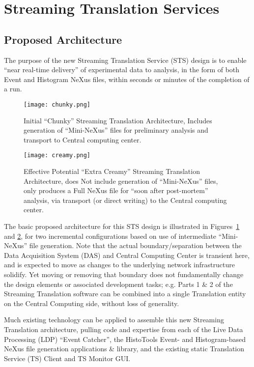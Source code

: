 \section{Streaming Translation Services}


\subsection{Proposed Architecture}

The purpose of the new Streaming Translation Service (STS) design is to enable
``near real-time delivery'' of experimental data to analysis, in the form of
both Event and Histogram NeXus files, within seconds or minutes of the
completion of a run.

\begin{figure}[htb]
\centering
\texttt{[image: chunky.png]}
\caption{Initial ``Chunky'' Streaming Translation Architecture, Includes
generation of ``Mini-NeXus'' files for preliminary analysis and transport to
Central computing center.}
\label{fig:chunky_sts}
\end{figure}


\begin{figure}[htb]
\centering
\texttt{[image: creamy.png]}
\caption{Effective Potential ``Extra Creamy'' Streaming Translation
Architecture, does Not include generation of ``Mini-NeXus'' files, only produces
a Full NeXus file for ``soon after post-mortem'' analysis, via transport (or
direct writing) to the Central computing center.}
\label{fig:creamy_sts}
\end{figure}


The basic proposed architecture for this STS design
is illustrated in Figures~\ref{fig:chunky_sts} and \ref{fig:creamy_sts},
for two incremental configurations based on use of intermediate
``Mini-NeXus'' file generation. Note that the actual boundary/separation between
the Data Acquisition System (DAS) and Central Computing Center is transient
here, and is expected to move as changes to the underlying network
infrastructure solidify. Yet moving or removing that boundary does not
fundamentally change the design elements or associated development tasks; e.g.
Parts 1 \& 2 of the Streaming Translation software can be combined into a
single Translation entity on the Central Computing side, without loss of
generality.


Much existing technology can be applied to assemble this new Streaming
Translation architecture, pulling code and expertise from each of the Live
Data Processing (LDP) ``Event Catcher'', the HistoTools Event- and
Histogram-based NeXus file generation applications \& library, and the
existing static Translation Service (TS) Client and TS Monitor GUI.  


